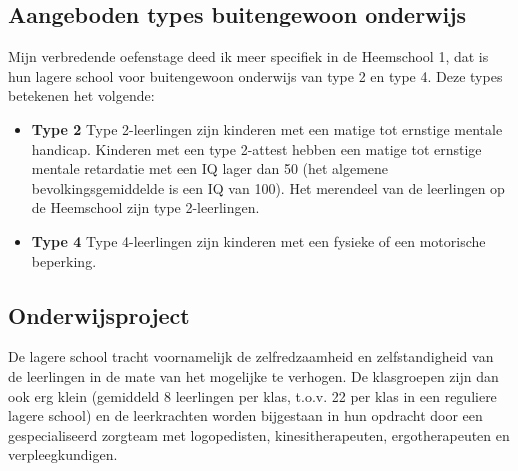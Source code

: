 \documentclass[a4paper,11pt]{article}
\theoremstyle{definition}
\begin{document}
\subsection{Aangeboden types buitengewoon onderwijs}
\noindent Mijn verbredende oefenstage deed ik meer specifiek in de Heemschool 1, dat is hun lagere school voor 
buitengewoon onderwijs van type 2 en type 4. Deze types betekenen 
het volgende:
\begin{itemize}
  \item \textbf{Type 2} Type 2-leerlingen zijn kinderen met een matige tot ernstige 
  mentale handicap. Kinderen met een type 2-attest hebben een matige tot 
  ernstige mentale retardatie met een IQ lager dan 50 (het algemene bevolkingsgemiddelde is een IQ van 
  100). Het merendeel van de leerlingen op de Heemschool zijn type 2-leerlingen.
  \item \textbf{Type 4} Type 4-leerlingen zijn kinderen met een fysieke of een motorische 
  beperking.
\end{itemize}
\subsection{Onderwijsproject}
\noindent De lagere school tracht voornamelijk de zelfredzaamheid en zelfstandigheid van 
de leerlingen in de mate van het mogelijke te verhogen. De klasgroepen zijn dan 
ook erg klein (gemiddeld 8 leerlingen per klas, t.o.v. 22 per klas in een reguliere lagere 
school) en de leerkrachten worden bijgestaan in hun opdracht door een
gespecialiseerd zorgteam met logopedisten, kinesitherapeuten, ergotherapeuten en
verpleegkundigen.\\
\end{document}
